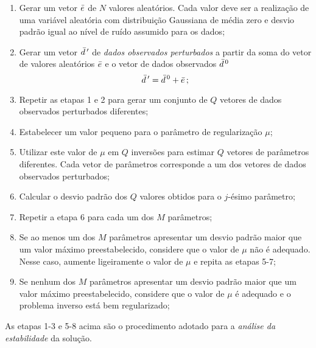 \begin{enumerate}
\item Gerar um vetor $\bar{e}$ de $N$ valores aleatórios.
Cada valor deve ser a realização de uma variável aleatória com distribuição
Gaussiana de média zero e desvio padrão igual ao nível de ruído assumido
para os dados;
\item Gerar um vetor $\bar{d}\thinspace'$ de {\it dados observados perturbados} a partir
da soma do vetor de valores aleatórios $\bar{e}$ e o vetor de dados observados
$\bar{d}^{\thinspace 0}$
\[
\bar{d}\thinspace' = \bar{d}^{\thinspace 0} + \bar{e} \thinspace ;
\]
\item Repetir as etapas 1 e 2 para gerar um conjunto de $Q$ vetores de dados
observados perturbados diferentes;
\item Estabelecer um valor pequeno para o parâmetro de regularização $\mu$;
\item Utilizar este valor de $\mu$ em $Q$ inversões para estimar $Q$ vetores de
parâmetros diferentes. Cada vetor de parâmetros corresponde a um dos vetores de
dados observados perturbados;
\item Calcular o desvio padrão dos $Q$ valores obtidos para o $j$-ésimo parâmetro;
\item Repetir a etapa 6 para cada um dos $M$ parâmetros;
\item Se ao menos um dos $M$ parâmetros apresentar um desvio padrão maior que um
valor máximo preestabelecido, considere que o valor de $\mu$ não é adequado.
Nesse caso, aumente ligeiramente o valor de $\mu$ e repita as etapas 5-7;
\item Se nenhum dos $M$ parâmetros apresentar um desvio padrão maior que um
valor máximo preestabelecido, considere que o valor de $\mu$ é adequado e o
problema inverso está bem regularizado;
\end{enumerate}

\noindent As etapas 1-3 e 5-8 acima são o procedimento adotado para a
{\it análise da estabilidade} da solução.
